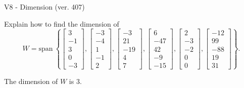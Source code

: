 \begin{exercise}
  \begin{exerciseTitle}V8 - Dimension (ver. 407)\end{exerciseTitle}
  \begin{exerciseStatement}
    Explain how to find the dimension of 
\[W=\mathrm{span}\ \left\{\left[\begin{array}{r}
3 \\
-1 \\
3 \\
0 \\
-3
\end{array}\right] , \left[\begin{array}{r}
-3 \\
-4 \\
1 \\
-1 \\
2
\end{array}\right] , \left[\begin{array}{r}
-3 \\
21 \\
-19 \\
4 \\
7
\end{array}\right] , \left[\begin{array}{r}
6 \\
-47 \\
42 \\
-9 \\
-15
\end{array}\right] , \left[\begin{array}{r}
2 \\
-3 \\
-2 \\
0 \\
0
\end{array}\right] , \left[\begin{array}{r}
-12 \\
99 \\
-88 \\
19 \\
31
\end{array}\right]\right\}.\]



  \end{exerciseStatement}
  \begin{exerciseAnswer}
   The dimension of \(W\) is  \(3\).
  


  \end{exerciseAnswer}
\end{exercise}